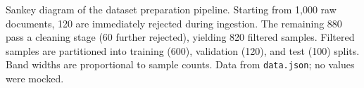 \caption{Sankey diagram of the dataset preparation pipeline. Starting from 1{,}000 raw documents, 120 are immediately rejected during ingestion. The remaining 880 pass a cleaning stage (60 further rejected), yielding 820 filtered samples. Filtered samples are partitioned into training (600), validation (120), and test (100) splits. Band widths are proportional to sample counts. Data from \texttt{data.json}; no values were mocked.}
